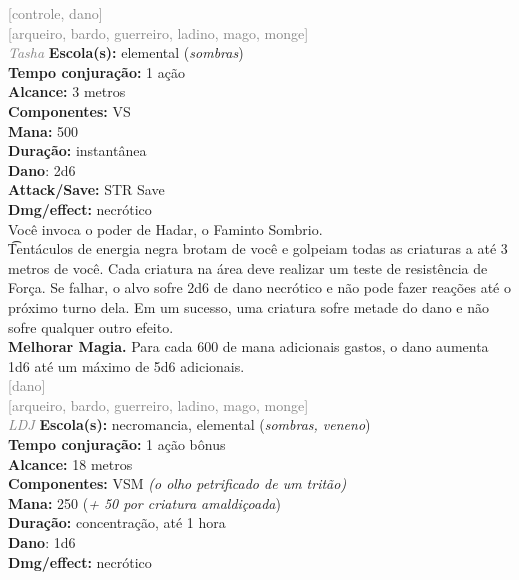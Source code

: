 \documentclass{RPG_Adventure}[2021/10/20]
\begin{document}
{\scriptsize \textcolor{gray}{[controle, dano]\\}}
{\scriptsize \textcolor{gray}{[arqueiro, bardo, guerreiro, ladino, mago, monge]\\}}
{\tiny \textcolor{gray}{\textit{Tasha}}}
{\small \t \textbf{Escola(s):} elemental (\textit{sombras})\\\t \textbf{Tempo conjuração:} 1 ação\\\t \textbf{Alcance:} 3 metros\\\t \textbf{Componentes:} VS\\\t \textbf{Mana:} 500\\\t \textbf{Duração:} instantânea\\\t \textbf{Dano}: 2d6\\\t \textbf{Attack/Save:} STR Save\\\t \textbf{Dmg/effect:} necrótico\\}
{\normalsize Você invoca o poder de Hadar, o Faminto Sombrio.\\\t Tentáculos de energia negra brotam de você e golpeiam todas as criaturas a até 3 metros de você. Cada criatura na área deve realizar um teste de resistência de Força. Se falhar, o alvo sofre 2d6 de dano necrótico e não pode fazer reações até o próximo turno dela. Em um sucesso, uma criatura sofre metade do dano e não sofre qualquer outro efeito.\\\t \textbf{Melhorar Magia.} Para cada 600 de mana adicionais gastos, o dano aumenta 1d6 até um máximo de 5d6 adicionais.\\}
{\scriptsize \textcolor{gray}{[dano]\\}}
{\scriptsize \textcolor{gray}{[arqueiro, bardo, guerreiro, ladino, mago, monge]\\}}
{\tiny \textcolor{gray}{\textit{LDJ}}}
{\small \t \textbf{Escola(s):} necromancia, elemental (\textit{sombras, veneno})\\\t \textbf{Tempo conjuração:} 1 ação bônus\\\t \textbf{Alcance:} 18 metros\\\t \textbf{Componentes:} VSM \textit{(o olho petrificado de um tritão)}\\\t \textbf{Mana:} 250 (\textit{+ 50 por criatura amaldiçoada})\\\t \textbf{Duração:} concentração, até 1 hora\\\t \textbf{Dano}: 1d6\\\t \textbf{Dmg/effect:} necrótico\\}
\end{document}
